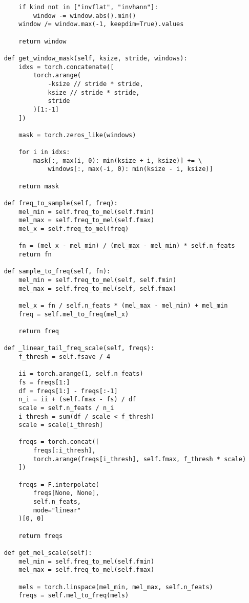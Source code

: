 \begin{verbatim}
        if kind not in ["invflat", "invhann"]:
            window -= window.abs().min()
        window /= window.max(-1, keepdim=True).values

        return window

    def get_window_mask(self, ksize, stride, windows):
        idxs = torch.concatenate([
            torch.arange(
                -ksize // stride * stride, 
                ksize // stride * stride, 
                stride
            )[1:-1]
        ])

        mask = torch.zeros_like(windows)

        for i in idxs:
            mask[:, max(i, 0): min(ksize + i, ksize)] += \
                windows[:, max(-i, 0): min(ksize - i, ksize)]

        return mask

    def freq_to_sample(self, freq):
        mel_min = self.freq_to_mel(self.fmin)
        mel_max = self.freq_to_mel(self.fmax)
        mel_x = self.freq_to_mel(freq)

        fn = (mel_x - mel_min) / (mel_max - mel_min) * self.n_feats
        return fn

    def sample_to_freq(self, fn):
        mel_min = self.freq_to_mel(self, self.fmin)
        mel_max = self.freq_to_mel(self, self.fmax)

        mel_x = fn / self.n_feats * (mel_max - mel_min) + mel_min
        freq = self.mel_to_freq(mel_x)

        return freq
    
    def _linear_tail_freq_scale(self, freqs):
        f_thresh = self.fsave / 4

        ii = torch.arange(1, self.n_feats)
        fs = freqs[1:]
        df = freqs[1:] - freqs[:-1]
        n_i = ii + (self.fmax - fs) / df
        scale = self.n_feats / n_i
        i_thresh = sum(df / scale < f_thresh)
        scale = scale[i_thresh]

        freqs = torch.concat([
            freqs[:i_thresh],
            torch.arange(freqs[i_thresh], self.fmax, f_thresh * scale)
        ])

        freqs = F.interpolate(
            freqs[None, None], 
            self.n_feats, 
            mode="linear"
        )[0, 0]

        return freqs

    def get_mel_scale(self):
        mel_min = self.freq_to_mel(self.fmin)
        mel_max = self.freq_to_mel(self.fmax)

        mels = torch.linspace(mel_min, mel_max, self.n_feats)
        freqs = self.mel_to_freq(mels)


\end{verbatim}

